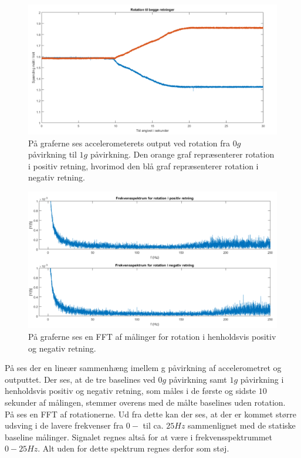 \begin{figure}[H]
	\centering
	\includegraphics[scale=0.45]{figures/cProblemloesning/Pilotforsoeg_Rotation.png}
	\caption{På graferne ses accelerometerets output ved rotation fra $0g$ påvirkning til $1g$ påvirkning. Den orange graf repræsenterer rotation i positiv retning, hvorimod den blå graf repræsenterer rotation i negativ retning.}
	\label{Fig:Pilot_Rottid}
\end{figure}
\begin{figure}[H]
	\centering
	\includegraphics[scale=0.5]{figures/cProblemloesning/Pilotforsoeg_RotationFrekvens.png}
	\caption{På graferne ses en FFT af målinger for rotation i henholdsvis positiv og negativ retning.}
	\label{Fig:Pilot_Rotfrek}
\end{figure}
På  ses der en lineær sammenhæng imellem g påvirkning af accelerometret og outputtet. Der ses, at de tre baselines ved $0g$ påvirkning samt $1g$ påvirkning i henholdsvis positiv og negativ retning, som måles i de første og sidste $10$ sekunder af målingen, stemmer overens med de målte baselines uden rotation. \\
På  ses en FFT af rotationerne. Ud fra dette kan der ses, at der er kommet større udsving i de lavere frekvenser fra $0-$ til ca. $25Hz$ sammenlignet med de statiske baseline målinger. Signalet regnes altså for at være i frekvensspektrummet $0-25Hz$. Alt uden for dette spektrum regnes derfor som støj.

